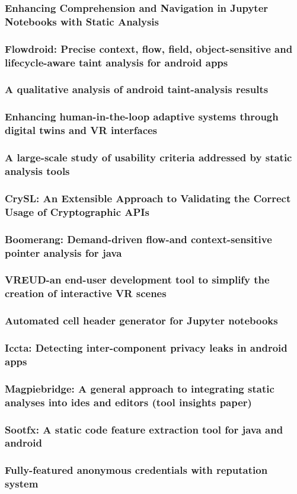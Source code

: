 \documentclass{beamer}
\begin{document}
\begin{frame}[plain]
\frametitle{Enhancing Comprehension and Navigation in Jupyter Notebooks with Static Analysis}
\end{frame}
\begin{frame}[plain]
\frametitle{Flowdroid: Precise context, flow, field, object-sensitive and lifecycle-aware taint analysis for android apps}
\end{frame}
\begin{frame}[plain]
\frametitle{A qualitative analysis of android taint-analysis results}
\end{frame}
\begin{frame}[plain]
\frametitle{Enhancing human-in-the-loop adaptive systems through digital twins and VR interfaces}
\end{frame}
\begin{frame}[plain]
\frametitle{A large-scale study of usability criteria addressed by static analysis tools}
\end{frame}
\begin{frame}[plain]
\frametitle{CrySL: An Extensible Approach to Validating the Correct Usage of Cryptographic APIs}
\end{frame}
\begin{frame}[plain]
\frametitle{Boomerang: Demand-driven flow-and context-sensitive pointer analysis for java}
\end{frame}
\begin{frame}[plain]
\frametitle{VREUD-an end-user development tool to simplify the creation of interactive VR scenes}
\end{frame}
\begin{frame}[plain]
\frametitle{Automated cell header generator for Jupyter notebooks}
\end{frame}
\begin{frame}[plain]
\frametitle{Iccta: Detecting inter-component privacy leaks in android apps}
\end{frame}
\begin{frame}[plain]
\frametitle{Magpiebridge: A general approach to integrating static analyses into ides and editors (tool insights paper)}
\end{frame}
\begin{frame}[plain]
\frametitle{Sootfx: A static code feature extraction tool for java and android}
\end{frame}
\begin{frame}[plain]
\frametitle{Fully-featured anonymous credentials with reputation system}
\end{frame}
\end{document}
